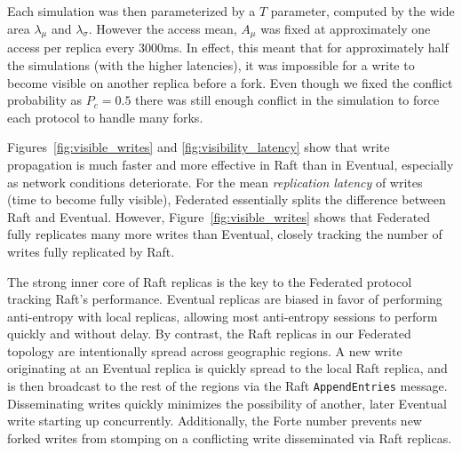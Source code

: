 \documentclass[10pt,conference,letterpaper]{IEEEtran}
\newcommand{\todo}[1]{{\textcolor{red}{#1}}}
\newcommand{\pjk}[1]{[\todo{PJK: #1}]}
\begin{document}
Each simulation was then parameterized by a $T$ parameter, computed by the
wide area $\lambda_{\mu}$ and $\lambda_{\sigma}$.
However the access mean, $A_{\mu}$ was fixed at approximately one access per replica every
3000ms.
In effect, this meant that for approximately half the simulations (with the higher
latencies), it was impossible for a write to become visible on another replica before a
fork.
Even though we fixed the conflict probability as $P_c=0.5$ there was still enough conflict
in the simulation to force each protocol to handle many forks.


Figures~\ref{fig:visible_writes} and \ref{fig:visibility_latency} show that
write propagation is much faster and more effective in Raft than in Eventual,
especially as network conditions deteriorate.
For the mean \emph{replication latency} of writes (time to become fully visible), Federated essentially splits the difference between Raft and Eventual.
However, Figure~\ref{fig:visible_writes} shows that Federated fully replicates many more
writes than Eventual, closely tracking the number of writes fully replicated by Raft.

The strong inner core of Raft replicas is the key to the Federated protocol
tracking Raft's performance.
Eventual replicas are biased in favor of performing anti-entropy with local
replicas, allowing most anti-entropy sessions to perform quickly and without
delay.
By contrast, the Raft replicas in our Federated topology are intentionally
spread across geographic regions.
A new write originating at an Eventual replica is quickly spread to the local
Raft replica, and is then broadcast to the rest of the regions via the Raft
\texttt{AppendEntries} message.
Disseminating writes quickly minimizes the possibility of another, later
Eventual write starting up concurrently.
Additionally, the Forte number prevents new forked writes from stomping on a
conflicting write disseminated via Raft replicas.
\end{document}
